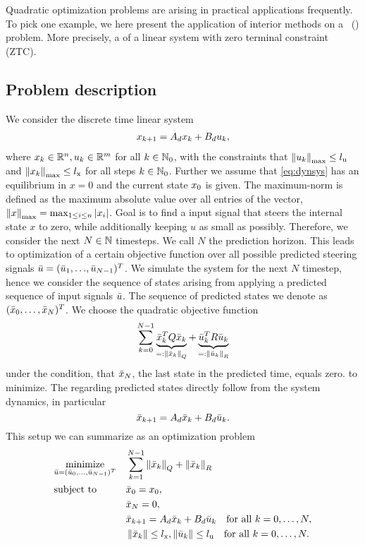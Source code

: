 Quadratic optimization problems are arising in practical applications frequently. To pick one example, we here present the application of interior methods on a \mpclong \ (\mpc) problem. More precisely, a \mpc of a linear system with zero terminal constraint (ZTC).

\subsection{Problem description \mpc}
We consider the discrete time linear system
\begin{align}
	x_{k+1} = A_d x_k + B_d u_k, \label{eq:dynsys}
\end{align}
where $ x_k \in \mathbb{R}^n, u_k \in \mathbb{R}^m $ for all $ k \in  \mathbb{N}_0$, with the constraints that $ {\left\lVert u_k\right\rVert}_{\mathrm{max}} \leq {l}_{\mathrm{u}}$
and $ {\left\lVert x_k\right\rVert}_{\mathrm{max}} \leq {l}_{\mathrm{x}} $ for all steps $ k\in \mathbb{N}_0 $. Further we assume that \eqref{eq:dynsys} has an equilibrium in $ x = 0 $ and the current state $ x_0 $ is given. The maximum-norm is defined as the maximum absolute value over all entries of the vector, ${\left\lVert x\right\rVert}_{\mathrm{max}} = \max_{1\leq i\leq n } |x_i| $.
Goal is to find a input signal that steers the internal state $ x $ to zero, while additionally keeping $ u $ as small as possibly. Therefore, we consider the next $ N \in \mathbb{N} $ timesteps. We call $ N $ the prediction horizon.
This leads to optimization of a certain objective function over all possible predicted steering signals $ \bar{u} = ({\bar{u}_1},{\dots},{\bar{u}_{N-1}})^T $. We simulate the system for the next $ N $ timestep, hence we consider the sequence of states arising from applying a predicted sequence of input signals $ \bar{u} $. The sequence of predicted states we denote as $ (\bar{x}_0,\dots,\bar{x}_N)^T $.
We choose the quadratic objective function
\begin{equation}
	\sum_{k = 0}^{N-1} \underbrace{\bar{x}_k^T Q \bar{x}_k }_{=: \left\lVert\bar{x}_k\right\rVert_Q}+ \underbrace{\bar{u}_k ^T R \bar{u}_k}_{=:\left\lVert\bar{u}_k\right\rVert_R} \label{eq:mpcobjraw}
\end{equation}
 under the condition, that $ \bar{x}_N $, the last state in the predicted time, equals zero. 
to minimize. The regarding predicted states directly follow from the system dynamics, in particular
\[ \bar{x}_{k+1} = A_d \bar{x}_k + B_d \bar{u}_k. \]
This setup we can summarize as an optimization problem
\begin{equation}
	\begin{aligned} \label{eq:mpcProblem}
	& \underset{\bar{u}=(\bar{u}_0,\dots,\bar{u}_{N-1})^T}{\text{minimize}}
	& & \sum_{k = 1}^{N-1} \left\lVert\bar{x}_k\right\rVert_Q + \left\lVert\bar{x}_k\right\rVert_R\\
	& \text{subject to}
	& & \bar{x}_0 = x_0,\\
	& & &\bar{x}_N = 0,\\
	& & &\bar{x}_{k+1} = A_d \bar{x}_k + B_d \bar{u}_k \text{\quad for all } k = 0,\dots,N,\\
	& & &\left\lVert\bar{x}_k\right\rVert \leq {l}_{\mathrm{x}}, \left\lVert\bar{u}_k\right\rVert \leq {l}_{\mathrm{u}} \text{\quad for all } k = 0,\dots,N.
	\end{aligned}
\end{equation}


